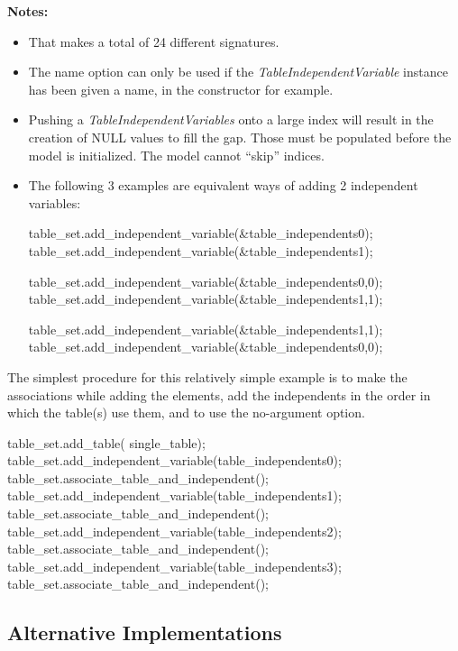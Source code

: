 \documentclass[11pt,fleqn]{report}
\begin{document}
\textbf{Notes:}
\begin{itemize}
 \item That makes a total of 24 different signatures.
 \item The name option can only be used if the
  \textit{TableIndependentVariable}  instance
  has been given a name, in the constructor for example.
 \item Pushing a \textit{TableIndependentVariables} onto a large index will
  result in the creation of NULL values to fill the gap.  Those must be
  populated before the model is initialized.  The model cannot ``skip''
  indices.
 \item The following 3 examples are equivalent ways of adding 2 independent
 variables:
\begin{code}
table_set.add_independent_variable(&table_independents0);
table_set.add_independent_variable(&table_independents1);
\end{code}

\begin{code}
table_set.add_independent_variable(&table_independents0,0);
table_set.add_independent_variable(&table_independents1,1);
\end{code}

\begin{code}
table_set.add_independent_variable(&table_independents1,1);
table_set.add_independent_variable(&table_independents0,0);
\end{code}
\end{itemize}


The simplest procedure for this relatively simple example is to make the
 associations while adding the elements, add the independents in the order
 in which the table(s) use them, and to use the no-argument option.

\begin{code}
  table_set.add_table( single_table);
  table_set.add_independent_variable(table_independents0);
  table_set.associate_table_and_independent();
  table_set.add_independent_variable(table_independents1);
  table_set.associate_table_and_independent();
  table_set.add_independent_variable(table_independents2);
  table_set.associate_table_and_independent();
  table_set.add_independent_variable(table_independents3);
  table_set.associate_table_and_independent();
\end{code}

\subsection{Alternative Implementations}
\end{document}
